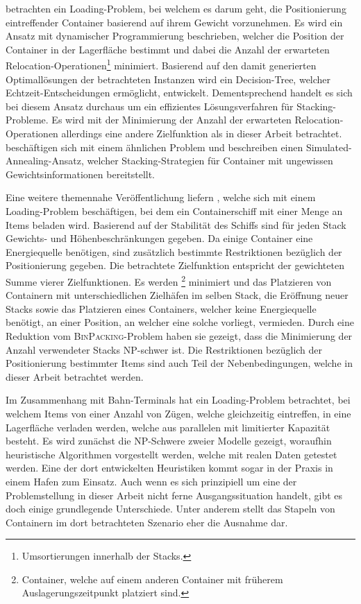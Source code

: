 \citet{Kim2000} betrachten ein Loading-Problem, bei welchem es darum geht, die Positionierung eintreffender
Container basierend auf ihrem Gewicht vorzunehmen. Es wird ein Ansatz mit dynamischer Programmierung beschrieben,
welcher die Position der Container in der Lagerfläche bestimmt und dabei die Anzahl der erwarteten
Relocation-Operationen\footnote{Umsortierungen innerhalb der Stacks.} minimiert.
Basierend auf den damit generierten Optimallösungen der betrachteten Instanzen wird ein Decision-Tree, welcher Echtzeit-Entscheidungen ermöglicht, entwickelt.
Dementsprechend handelt es sich bei diesem Ansatz durchaus um ein effizientes Lösungsverfahren für Stacking-Probleme.
Es wird mit der Minimierung der Anzahl der erwarteten Relocation-Operationen allerdings eine andere Zielfunktion
als in dieser Arbeit betrachtet.\newline
\citet{Kang2006} beschäftigen sich mit einem ähnlichen Problem und beschreiben einen Simulated-Annealing-Ansatz,
welcher Stacking-Strategien für Container mit ungewissen Gewichtsinformationen bereitstellt.

\pagebreak

Eine weitere themennahe Veröffentlichung liefern \citet{Delgado2012}, welche sich mit einem
Loading-Problem beschäftigen, bei dem ein Containerschiff mit einer Menge an Items beladen wird.
Basierend auf der Stabilität des Schiffs sind für jeden Stack Gewichts- und Höhenbeschränkungen gegeben.
Da einige Container eine Energiequelle benötigen, sind zusätzlich bestimmte Restriktionen bezüglich der
Positionierung gegeben.
Die betrachtete Zielfunktion entspricht der gewichteten Summe vierer Zielfunktionen.
Es werden \footnote{Container, welche auf einem anderen Container mit früherem Auslagerungszeitpunkt platziert sind.} minimiert und das Platzieren von Containern mit unterschiedlichen Zielhäfen
im selben Stack, die Eröffnung neuer Stacks sowie das Platzieren eines Containers,
welcher keine Energiequelle benötigt, an einer Position, an welcher eine solche vorliegt, vermieden.
Durch eine Reduktion vom \textsc{BinPacking}-Problem haben sie gezeigt,
dass die Minimierung der Anzahl verwendeter Stacks NP-schwer ist.
Die Restriktionen bezüglich der Positionierung bestimmter Items sind auch Teil der Nebenbedingungen,
welche in dieser Arbeit betrachtet werden.

Im Zusammenhang mit Bahn-Terminals hat \citet{Jaehn2013} ein Loading-Problem betrachtet,
bei welchem Items von einer Anzahl von Zügen, welche gleichzeitig eintreffen,
in eine Lagerfläche verladen werden, welche aus parallelen  mit limitierter Kapazität besteht.
Es wird zunächst die NP-Schwere zweier Modelle gezeigt, woraufhin heuristische Algorithmen vorgestellt werden,
welche mit realen Daten getestet werden. Eine der dort entwickelten Heuristiken kommt sogar in der Praxis
in einem Hafen zum Einsatz. Auch wenn es sich prinzipiell um eine der Problemstellung in dieser
Arbeit nicht ferne Ausgangssituation handelt, gibt es doch einige grundlegende Unterschiede.
Unter anderem stellt das Stapeln von Containern im dort betrachteten Szenario eher die Ausnahme dar.

